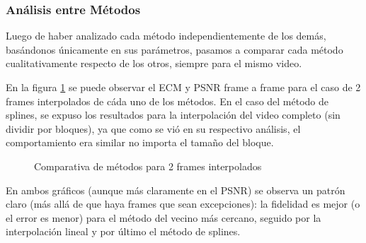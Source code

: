 

\subsubsection{An\'alisis entre M\'etodos}
\par Luego de haber analizado cada m\'etodo independientemente de los dem\'as,
bas\'andonos \'unicamente en sus par\'ametros, pasamos a comparar cada m\'etodo
cualitativamente respecto de los otros, siempre para el mismo video.

\par En la figura \ref{fig:fija-fija_metodos} se puede observar el ECM y PSNR
frame a frame para el caso de 2 frames interpolados de c\'ada uno de los
m\'etodos.  En el caso del m\'etodo de splines, se expuso los resultados para
la interpolaci\'on del video completo (sin dividir por bloques), ya que como se
vi\'o en su respectivo an\'alisis, el comportamiento era similar no importa el
tama\~no del bloque.

\begin{figure}[H]
    \centering
    \caption{Comparativa de m\'etodos para 2 frames interpolados}
    \label{fig:fija-fija_metodos}
\end{figure}

\par En ambos gr\'aficos (aunque m\'as claramente en el PSNR) se observa un patr\'on
claro (m\'as all\'a de que haya frames que sean excepciones): la fidelidad es mejor
(o el error es menor) para el m\'etodo del vecino m\'as cercano, seguido por la
interpolaci\'on lineal y por \'ultimo el m\'etodo de splines.

